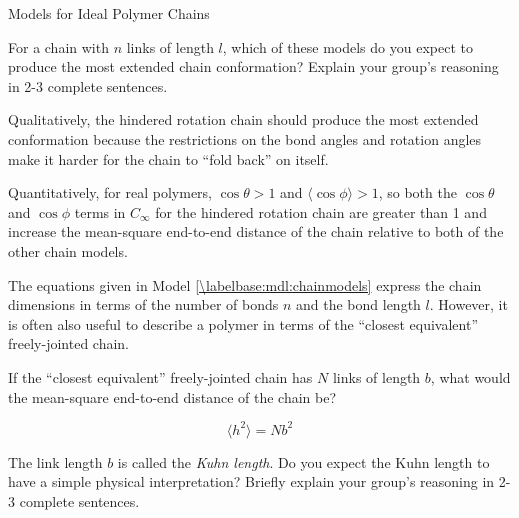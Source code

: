 \begin{activity}{Models for Ideal Polymer Chains}
\begin{ctqs}
	\question For a chain with $n$ links of length $l$, which of these models do you expect to produce the most extended chain conformation?  Explain your group's reasoning in 2-3 complete sentences. \label{\labelbase:ctq:stiffness}
	
		\begin{solution}[1.5in]
			Qualitatively, the hindered rotation chain should produce the most extended conformation because the restrictions on the bond angles and rotation angles make it harder for the chain to ``fold back'' on itself.
			
			Quantitatively, for real polymers, $\cos\theta > 1$ and $\langle \cos\phi \rangle > 1$, so both the $\cos \theta$ and $\cos \phi$ terms in $C_\infty$ for the hindered rotation chain are greater than 1 and increase the mean-square end-to-end distance of the chain relative to both of the other chain models.
		\end{solution}

	
	\question The equations given in Model \ref{\labelbase:mdl:chainmodels} express the chain dimensions in terms of the number of bonds $n$ and the bond length $l$.  However, it is often also useful to describe a polymer in terms of the ``closest equivalent'' freely-jointed chain. \label{\labelbase:ctq:statseg}
	
			If the ``closest equivalent'' freely-jointed chain has $N$ links of length $b$, what would the mean-square end-to-end distance of the chain be? \label{\labelbase:ctq:Nb2}
	
		\begin{solution}[0.75in]
			\begin{equation*}
				\langle h^2 \rangle = Nb^2
			\end{equation*}
		\end{solution}
			
%	
%		
		
	\question The link length $b$ is called the \emph{Kuhn length}.  Do you expect the Kuhn length to have a simple physical interpretation?  Briefly explain your group's reasoning in 2-3 complete sentences.\label{\labelbase:exc:statseginterp}
	

\end{ctqs}
\end{activity}
